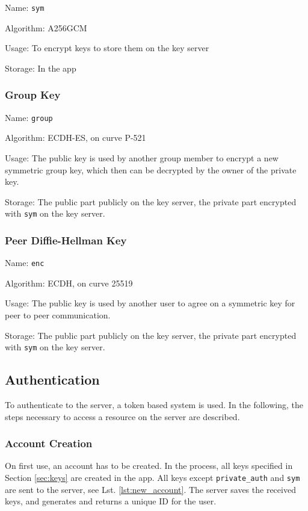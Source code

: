 \documentclass[a4paper, oneside]{discothesis}
\begin{document}
Name: \texttt{sym}

\noindent
Algorithm: A256GCM

\noindent
Usage: To encrypt keys to store them on the key server

\noindent
Storage: In the app

\subsubsection{Group Key}

Name: \texttt{group}

\noindent
Algorithm: ECDH-ES, on curve P-521

\noindent
Usage: The public key is used by another group member to encrypt a new symmetric group key, which then can be decrypted by the owner of the private key.

\noindent
Storage: The public part publicly on the key server, the private part encrypted with \texttt{sym} on the key server.

\subsubsection{Peer Diffie-Hellman Key}

Name: \texttt{enc}

\noindent
Algorithm: ECDH, on curve 25519

\noindent
Usage: The public key is used by another user to agree on a symmetric key for peer to peer communication.

\noindent
Storage: The public part publicly on the key server, the private part encrypted with \texttt{sym} on the key server.

\subsection{Authentication}

To authenticate to the server, a token based system is used. In the following, the steps necessary to access a resource on the server are described.

\subsubsection{Account Creation}

On first use, an account has to be created. In the process, all keys specified in Section \ref{sec:keys} are created in the app. All keys except \texttt{private\_auth} and \texttt{sym} are sent to the server, see Lst. \ref{lst:new_account}. The server saves the received keys, and generates and returns a unique ID for the user.
\end{document}
